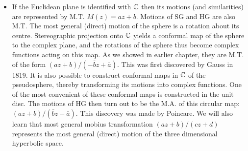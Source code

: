 \documentclass[12pt]{article}
\def\mb{\ensuremath\mathbb}
\def\C{\ensuremath\mb{C}}
\begin{document}
\begin{itemize}
    \item If the Euclidean plane is identified with $\C$ then its motions (and similarities) are represented by M.T. $M(z)=az+b$. Motions of SG and HG are also M.T. The most general (direct) motion of the sphere is a rotation about its centre. Stereographic projection onto $\C$ yields a conformal map of the sphere to the complex plane, and the rotations of the sphere thus become complex functions acting on this map. As we showed in earlier chapter, they are M.T. of the form $(az+b)/(-\bar{b}z+\bar{a})$. This was first discovered by Gauss in 1819. It is also possible to construct conformal maps in $\C$ of the pseudosphere, thereby transforming its motions into complex functions. One of the most convenient of these conformal maps is constructed in the unit disc. The motions of HG then turn out to be the M.A. of this circular map: $(az+b)/(\bar{b}z+\bar{a})$. This discovery was made by Poincare. We will also learn that most general mobius transformation $(az+b)/(cz+d)$ represents the most general (direct) motion of the three dimensional hyperbolic space.
\end{itemize}
\end{document}
